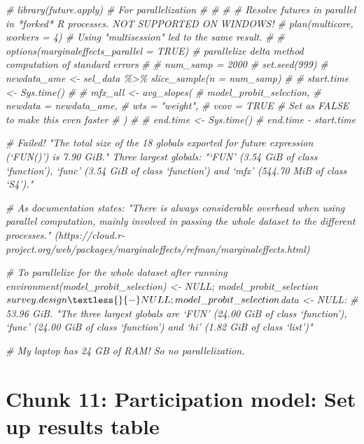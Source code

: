 \documentclass[
]{article}
\newenvironment{Shaded}{\begin{snugshade}}{\end{snugshade}}
\newcommand{\CommentTok}[1]{\textcolor[rgb]{0.56,0.35,0.01}{\textit{#1}}}
\begin{document}
\begin{Shaded}
\begin{Highlighting}[]
\CommentTok{\# library(future.apply) \# For parallelization}
\CommentTok{\# \# }
\CommentTok{\# \# Resolve futures in parallel in *forked* R processes. NOT SUPPORTED ON WINDOWS!}
\CommentTok{\# plan(multicore, workers = 4) \# Using "multisession" led to the same result.}
\CommentTok{\# }
\CommentTok{\# options(marginaleffects\_parallel = TRUE) \# parallelize delta method computation of standard errors}
\CommentTok{\# }
\CommentTok{\# num\_samp = 2000}
\CommentTok{\# set.seed(999)}
\CommentTok{\# newdata\_ame \textless{}{-} sel\_data \%\textgreater{}\% slice\_sample(n = num\_samp)}
\CommentTok{\# }
\CommentTok{\# start.time \textless{}{-} Sys.time()}
\CommentTok{\# }
\CommentTok{\# mfx\_all \textless{}{-} avg\_slopes(}
\CommentTok{\#   model\_probit\_selection,}
\CommentTok{\#   newdata = newdata\_ame,}
\CommentTok{\#   wts = "weight",}
\CommentTok{\#   vcov = TRUE \# Set as FALSE to make this even faster}
\CommentTok{\# )}
\CommentTok{\# }
\CommentTok{\# end.time \textless{}{-} Sys.time()}
\CommentTok{\# end.time {-} start.time}

\CommentTok{\# Failed! "The total size of the 18 globals exported for future expression (‘FUN()’) is 7.90 GiB." Three largest globals: "‘FUN’ (3.54 GiB of class ‘function’), ‘func’ (3.54 GiB of class ‘function’) and ‘mfx’ (544.70 MiB of class ‘S4’)."}

\CommentTok{\# As documentation states: "There is always considerable overhead when using parallel computation, mainly involved in passing the whole dataset to the different processes." (https://cloud.r{-}project.org/web/packages/marginaleffects/refman/marginaleffects.html)}


\CommentTok{\# To parallelize for the whole dataset after running \textasciigrave{}environment(model\_probit\_selection) \textless{}{-} NULL; model\_probit\_selection$survey.design \textless{}{-} NULL; model\_probit\_selection$data \textless{}{-} NULL\textasciigrave{}: }
\CommentTok{\# 53.96 GiB. "The three largest globals are ‘FUN’ (24.00 GiB of class ‘function’), ‘func’ (24.00 GiB of class ‘function’) and ‘hi’ (1.82 GiB of class ‘list’)"}

\CommentTok{\# My laptop has 24 GB of RAM! So no parallelization.}
\end{Highlighting}
\end{Shaded}

\section*{Chunk 11: Participation model: Set up results table}\label{chunk-11-participation-model-set-up-results-table}
\end{document}
